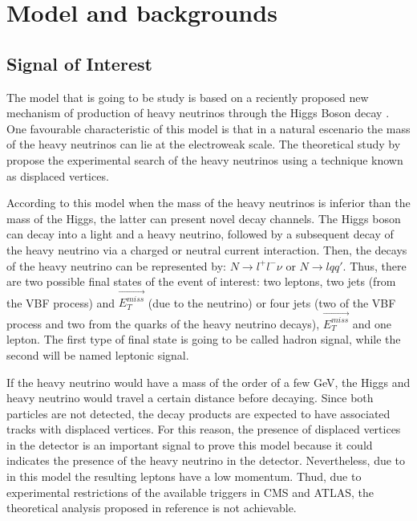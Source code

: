  \chapter{Model and backgrounds}

 
\section{Signal of Interest}

The model that is going to be study is based on a reciently proposed new mechanism of production of heavy neutrinos through the Higgs Boson decay \cite{Seesaw Mechanism with displaced vertices}. One favourable characteristic of this model is that in a natural escenario the mass of the heavy neutrinos can lie at the electroweak scale. The theoretical study by \cite{Seesaw Mechanism with displaced vertices} propose the experimental search of the heavy neutrinos using a technique known as displaced vertices.

According to this model when the mass of the heavy neutrinos is inferior than the mass of the Higgs, the latter can present novel decay channels. The Higgs boson can decay into a light and a heavy neutrino, followed by a subsequent decay of the heavy neutrino via a charged or neutral current interaction. Then, the decays of the heavy neutrino can be represented by: $N \rightarrow l^+ l^- \nu$ or $N \rightarrow l q q'$. Thus, there are two possible final states of the event of interest: two leptons, two jets (from the VBF process) and $\vec{E_T^{miss}}$ (due to the neutrino) or four jets (two of the VBF process and two from the quarks of the heavy neutrino decays), $\vec{E_T^{miss}}$ and one lepton. The first type of final state is going to be called hadron signal, while the second will be named leptonic signal.

If the heavy neutrino would have a mass of the order of a few GeV, the Higgs and heavy neutrino would travel a certain distance before decaying. Since both particles are not detected, the decay products are expected to have associated tracks with displaced vertices. For this reason, the presence of displaced vertices in the detector is an important signal to prove this model because it could indicates the presence of the heavy neutrino in the detector. Nevertheless, due to in this model the resulting leptons have a low momentum. Thud, due to experimental restrictions of the available triggers in CMS and ATLAS, the theoretical analysis proposed in reference \cite{Seesaw Mechanism with displace vertices} is not achievable.  

